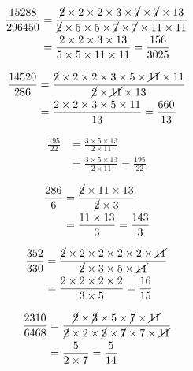 {{\item\begin{align*}
    \frac{15288}{296450} &=
    \frac{\cancel{2} \times 2 \times 2 \times 3 \times \cancel{7} \times \cancel{7} \times 13}
    {\cancel{2} \times 5 \times 5 \times \cancel{7} \times \cancel{7} \times 11 \times 11}\\ &=
    \frac{2 \times 2 \times 3 \times 13}
    {5 \times 5 \times 11 \times 11} =
    \frac{156}{3025}
    \end{align*}

\item\begin{align*}
    \frac{14520}{286} &=
    \frac{\cancel{2} \times 2 \times 2 \times 3 \times 5 \times \cancel{11} \times 11}
    {\cancel{2} \times \cancel{11} \times 13}\\ &=
    \frac{2 \times 2 \times 3 \times 5 \times 11}
    {13} =
    \frac{660}{13}
    \end{align*}

\item\begin{align*}
    \frac{195}{22} &=
    \frac{3 \times 5 \times 13}
    {2 \times 11}\\ &=
    \frac{3 \times 5 \times 13}
    {2 \times 11} =
    \frac{195}{22}
    \end{align*}

\item\begin{align*}
    \frac{286}{6} &=
    \frac{\cancel{2} \times 11 \times 13}
    {\cancel{2} \times 3}\\ &=
    \frac{11 \times 13}
    {3} =
    \frac{143}{3}
    \end{align*}

\item\begin{align*}
    \frac{352}{330} &=
    \frac{\cancel{2} \times 2 \times 2 \times 2 \times 2 \times \cancel{11}}
    {\cancel{2} \times 3 \times 5 \times \cancel{11}}\\ &=
    \frac{2 \times 2 \times 2 \times 2}
    {3 \times 5} =
    \frac{16}{15}
    \end{align*}

\item\begin{align*}
    \frac{2310}{6468} &=
    \frac{\cancel{2} \times \cancel{3} \times 5 \times \cancel{7} \times \cancel{11}}
    {\cancel{2} \times 2 \times \cancel{3} \times \cancel{7} \times 7 \times \cancel{11}}\\ &=
    \frac{5}
    {2 \times 7} =
    \frac{5}{14}
    \end{align*}

}}
